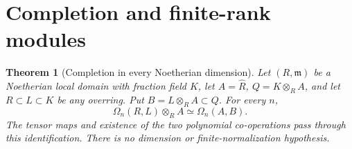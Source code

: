 \documentclass[11pt,a4paper]{article}
\newtheorem{theorem}{Theorem}[section]
\theoremstyle{definition}
\begin{document}
\section{Completion and finite-rank modules}
\begin{theorem}[Completion in every Noetherian dimension]\label{result-31}
Let $(R,\mathfrak m)$ be a Noetherian local domain with
fraction field $K$, let $A=\widehat R$, $Q=K\otimes_R A$,
and let $R\subset L\subset K$ be any overring.
Put $B=L\otimes_R A\subset Q$. For every $n$,
\begin{equation}
                    \Omega_n(R,L)\otimes_R A
                         \simeq\Omega_n(A,B).              \label{equation-69}
\end{equation}
The tensor maps and existence of the two polynomial
co-operations pass through this identification. There is
no dimension or finite-normalization hypothesis.
\end{theorem}
\end{document}
